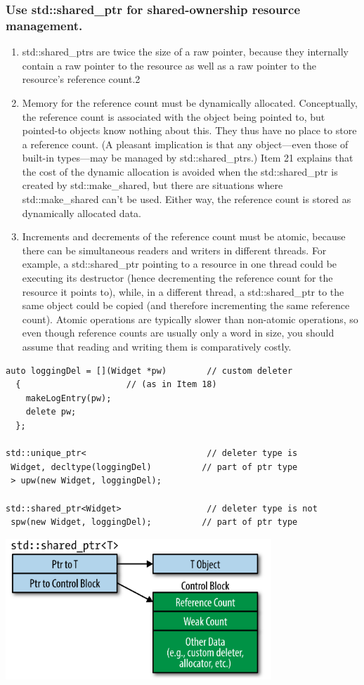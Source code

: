 \documentclass[a4paper]{exam}
\theoremstyle{definition}
\begin{document}
\subsubsection{Use std::shared\_ptr for shared-ownership resource management.}
\begin{enumerate}
  \item std::shared\_ptrs are twice the size of a raw pointer, because they internally contain a raw pointer to the resource as well as a raw pointer to the resource’s reference count.2

  \item Memory for the reference count must be dynamically allocated. Conceptually, the reference count is associated with the object being pointed to, but pointed-to objects know nothing about this. They thus have no place to store a reference count. (A pleasant implication is that any object—even those of built-in types—may be managed by std::shared\_ptrs.) Item 21 explains that the cost of the dynamic allocation is avoided when the std::shared\_ptr is created by std::make\_shared, but there are situations where std::make\_shared can’t be used. Either way, the reference count is stored as dynamically allocated data.
  
  \item Increments and decrements of the reference count must be atomic, because there can be simultaneous readers and writers in different threads. For example, a std::shared\_ptr pointing to a resource in one thread could be executing its destructor (hence decrementing the reference count for the resource it points to), while, in a different thread, a std::shared\_ptr to the same object could be copied (and therefore incrementing the same reference count). Atomic operations are typically slower than non-atomic operations, so even though reference counts are usually only a word in size, you should assume that reading and writing them is comparatively costly.
\end{enumerate}

\begin{verbatim}
auto loggingDel = [](Widget *pw)        // custom deleter
  {                     // (as in Item 18)
    makeLogEntry(pw);
    delete pw;
  };

std::unique_ptr<                        // deleter type is
 Widget, decltype(loggingDel)          // part of ptr type
 > upw(new Widget, loggingDel);

std::shared_ptr<Widget>                 // deleter type is not
 spw(new Widget, loggingDel);          // part of ptr type
\end{verbatim}
\includegraphics[width=10cm]{img/shared_ptr.png}
\end{document}
